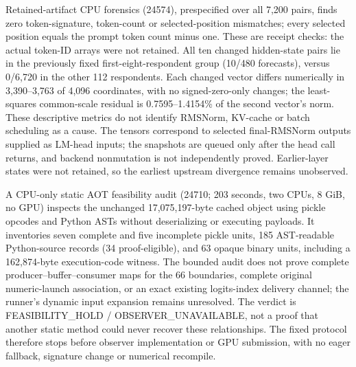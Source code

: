 Retained-artifact CPU forensics (24574), prespecified over all 7,200 pairs,
finds zero token-signature, token-count or selected-position mismatches;
every selected position equals the prompt token count minus one. These are
receipt checks: the actual token-ID arrays were not retained. All ten changed
hidden-state pairs lie in the previously fixed first-eight-respondent group
(10/480 forecasts), versus 0/6,720 in the other 112 respondents. Each changed
vector differs numerically in 3,390--3,763 of 4,096 coordinates, with no
signed-zero-only changes; the least-squares common-scale residual is
0.7595--1.4154\% of the second vector's norm. These descriptive metrics do
not identify RMSNorm, KV-cache or batch scheduling as a cause. The tensors
correspond to selected final-RMSNorm outputs supplied as LM-head inputs;
the snapshots are queued only after the head call returns, and backend
nonmutation is not independently proved. Earlier-layer states were
not retained, so the earliest upstream divergence remains unobserved.


A CPU-only static AOT feasibility audit (24710; 203 seconds, two CPUs,
8 GiB, no GPU) inspects the unchanged 17,075,197-byte cached object using
pickle opcodes and Python ASTs without deserializing or executing payloads.
It inventories seven complete and five incomplete pickle units,
185 AST-readable Python-source records (34 proof-eligible), and 63 opaque
binary units, including
a 162,874-byte execution-code witness. The bounded audit does not prove complete producer--buffer--consumer maps
for the 66 boundaries, complete original numeric-launch association, or an
exact existing logits-index delivery channel; the runner's dynamic input expansion remains
unresolved. The verdict is FEASIBILITY\_HOLD / OBSERVER\_UNAVAILABLE, not a
proof that another static method could never recover these relationships.
The fixed protocol therefore stops before observer implementation or GPU
submission, with no eager fallback, signature change or numerical recompile.
